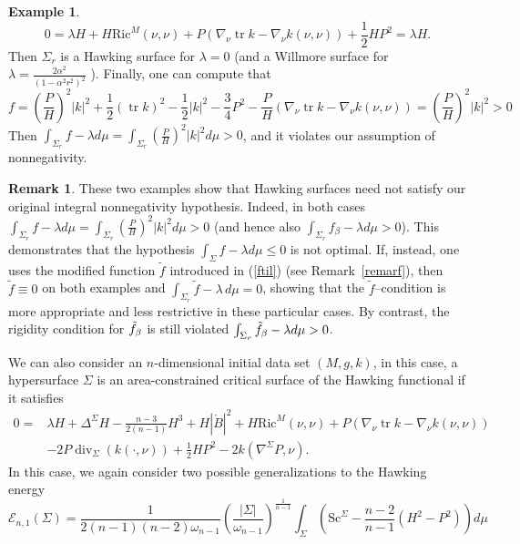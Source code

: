 \documentclass[12pt,a4paper]{amsart}
\theoremstyle{plain}
\theoremstyle{definition}
\newtheorem{remark}[theorem]{Remark}
\newtheorem{example}[theorem]{Example}
\newcommand{\diver}{\operatorname{div}}
\newcommand{\tr}{\operatorname{tr}}
\begin{document}
\begin{example}
\begin{equation}
  0=  \lambda H   + H \mathrm{Ric}^M(\nu, \nu)+P( \nabla_\nu \tr k - \nabla_\nu k(\nu,\nu ))  +\frac{1}{2}H P^2 =  \lambda H.
\end{equation}
Then  $\Sigma_r$ is a Hawking surface for $\lambda=0$ (and a Willmore surface for $\lambda =\frac{2\alpha^2 }{(1-\alpha^2 r^2 )^2}$ ). Finally, one can compute that  
\begin{equation}
    f= \left( \frac{P}{H}\right)^2|k|^2+ \frac{1}{2 }(\tr k)^2  - \frac{1}{2}|k|^2  - \frac{3}{4} P^2 -\frac{P}{H}( \nabla_\nu \tr k - \nabla_\nu k(\nu,\nu ))= \left( \frac{P}{H}\right)^2|k|^2 >0 
\end{equation}
Then $\int_{\Sigma_r} f-\lambda d\mu= \int_{\Sigma_r} \left( \frac{P}{H}\right)^2|k|^2 d\mu >0 $, and it violates our assumption of nonnegativity. 
\end{example}
\begin{remark}
    These two examples show that Hawking surfaces need not satisfy our original integral nonnegativity hypothesis.  Indeed, in both cases  $\int_{\Sigma_r} f-\lambda d\mu= \int_{\Sigma_r} \left( \frac{P}{H}\right)^2|k|^2 d\mu >0 $ (and hence also  $\int_{\Sigma_r} f_\beta-\lambda d\mu >0 $). This demonstrates that the hypothesis $\int_{\Sigma} f-\lambda d\mu\leq 0 $ is not optimal. If, instead, one uses the modified function \(\tilde f\) introduced in (\ref{ftil}) (see Remark~\ref{remarf}), then \(\tilde f\equiv0\) on both examples and $\int_{\Sigma_r}\tilde f-\lambda\,d\mu=0$, showing that the \(\tilde f\)–condition is more appropriate and less restrictive in these particular cases.  By contrast, the rigidity condition for $\Tilde{f}_\beta$ is still violated $\int_{\Sigma_r} \Tilde{f}_\beta-\lambda d\mu >0 $.
\end{remark}
 We can also consider an $n$-dimensional initial data set $(M,g,k)$, in this case, a hypersurface $\Sigma$ is an area-constrained critical surface of the Hawking functional if it satisfies 
\begin{equation}\label{eulaghigh}
\begin{split}
   0=& \lambda H  +\Delta^\Sigma H - \frac{n-3}{2(n-1)}H^3 + H|\mathring{B}|^2+ H \mathrm{Ric}^M(\nu, \nu)+P( \nabla_\nu \tr k - \nabla_\nu k(\nu,\nu )) \\ & - 2P \diver_\Sigma (k(\cdot, \nu)) +\frac{1}{2}H P^2 - 2k (\nabla^\Sigma P, \nu ).
    \end{split}
\end{equation}
In this case, we again consider two possible generalizations to the Hawking energy 
\begin{equation}
 \mathcal{E}_{n,1}(\Sigma)=   \frac{1}{2(n-1)(n-2) \omega_{n-1}} 
\left( \frac{|\Sigma|}{\omega_{n-1}} \right)^{\frac{1}{n-1}}
\int_{\Sigma} 
\left( \mathrm{Sc}^{\Sigma} - \frac{n-2}{n-1} (H^2-P^2) \right)
d\mu
\end{equation}
\end{document}
